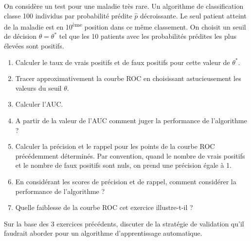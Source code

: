 \documentclass[solutions]{../exercices}
\begin{document}
	\begin{exercice}
		On considère un test pour une maladie très rare. Un algorithme de classification classe 100 individus par probabilité prédite $\hat{p}$ décroissante. Le seul patient atteint de la maladie est en 10\textsuperscript{ème} position dans ce même classement. On choisit un seuil de décision $\theta = \theta^*$ tel que les 10 patients avec les probabilités prédites les plus élevées sont positifs.
		\begin{enumerate}
			\item Calculer le taux de vrais positifs et de faux positifs pour cette valeur de $\theta^*$.
			\item Tracer approximativement la courbe ROC en choisissant astucieusement les valeurs du seuil $\theta$.
			\item Calculer l'AUC.
			\item A partir de la valeur de l'AUC comment juger la performance de l'algorithme ?
			\item Calculer la précision et le rappel pour les points de la courbe ROC précédemment déterminés. Par convention, quand le nombre de vrais positifs et le nombre de faux positifs sont nuls, on prend une précision égale à 1.
			\item En considérant les scores de précision et de rappel, comment considérer la performance de l'algorithme ?
			\item Quelle faiblesse de la courbe ROC cet exercice illustre-t-il ?
		\end{enumerate}
	\end{exercice}
	
	\begin{exercice}
		Sur la base des 3 exercices précédents, discuter de la stratégie de validation qu'il faudrait aborder pour un algorithme d'apprentissage automatique.
	\end{exercice}
			
\end{document}
